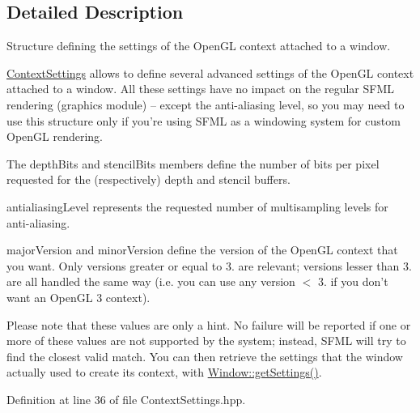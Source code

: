 \subsection{Detailed Description}
Structure defining the settings of the Open\-G\-L context attached to a window. 

\hyperlink{structsf_1_1ContextSettings}{Context\-Settings} allows to define several advanced settings of the Open\-G\-L context attached to a window. All these settings have no impact on the regular S\-F\-M\-L rendering (graphics module) -- except the anti-\/aliasing level, so you may need to use this structure only if you're using S\-F\-M\-L as a windowing system for custom Open\-G\-L rendering.

The depth\-Bits and stencil\-Bits members define the number of bits per pixel requested for the (respectively) depth and stencil buffers.

antialiasing\-Level represents the requested number of multisampling levels for anti-\/aliasing.

major\-Version and minor\-Version define the version of the Open\-G\-L context that you want. Only versions greater or equal to 3. are relevant; versions lesser than 3. are all handled the same way (i.\-e. you can use any version $<$ 3. if you don't want an Open\-G\-L 3 context).

Please note that these values are only a hint. No failure will be reported if one or more of these values are not supported by the system; instead, S\-F\-M\-L will try to find the closest valid match. You can then retrieve the settings that the window actually used to create its context, with \hyperlink{classsf_1_1Window_a5a9d5c15facf25ad4d9b2b30caa0a2db}{Window\-::get\-Settings()}. 

Definition at line 36 of file Context\-Settings.\-hpp.



